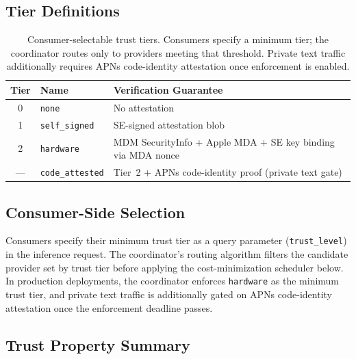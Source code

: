 \documentclass[10pt,twocolumn,letterpaper]{article}
\begin{document}
\subsection{Tier Definitions}

\begin{table}[h]
\centering
\caption{Consumer-selectable trust tiers. Consumers specify a minimum tier; the coordinator routes only to providers meeting that threshold. Private text traffic additionally requires APNs code-identity attestation once enforcement is enabled.}
\vspace{4pt}
\scriptsize
\begin{tabular}{@{}clp{4.2cm}@{}}
\toprule
\textbf{Tier} & \textbf{Name} & \textbf{Verification Guarantee} \\
\midrule
0 & \texttt{none} & No attestation \\
1 & \texttt{self\_signed} & SE-signed attestation blob \\
2 & \texttt{hardware} & MDM SecurityInfo + Apple MDA + SE key binding via MDA nonce \\
--- & \texttt{code\_attested} & Tier~2 + APNs code-identity proof (private text gate) \\
\bottomrule
\end{tabular}
\end{table}

\subsection{Consumer-Side Selection}

Consumers specify their minimum trust tier as a query parameter (\texttt{trust\_level}) in the inference request. The coordinator's routing algorithm filters the candidate provider set by trust tier before applying the cost-minimization scheduler below. In production deployments, the coordinator enforces \texttt{hardware} as the minimum trust tier, and private text traffic is additionally gated on APNs code-identity attestation once the enforcement deadline passes.

\subsection{Trust Property Summary}
\end{document}
